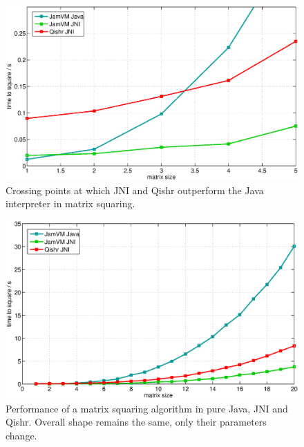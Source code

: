 \documentclass[a4paper,12pt,twoside,openright]{report}
\begin{document}
\begin{figure}
	\centering
	\includegraphics[width=1.1\textwidth]{graph_matrix_crossing.eps}
	\caption{Crossing points at which JNI and Qishr outperform the Java interpreter in matrix squaring.}
	\label{fig:OverheadMatrixCrossing}
\end{figure}

\begin{figure}
	\centering
	\includegraphics[width=1.1\textwidth]{graph_matrix.eps}
	\caption{Performance of a matrix squaring algorithm in pure Java, JNI and Qishr. Overall shape remains the same, only their parameters change.}
	\label{fig:OverheadMatrix}
\end{figure}
\end{document}
